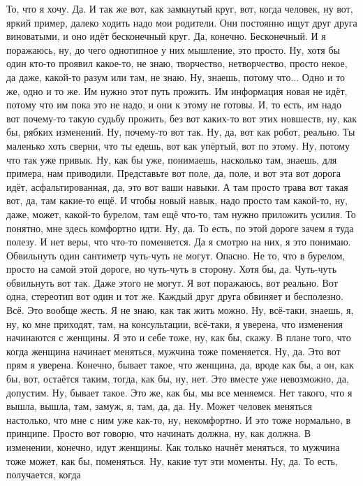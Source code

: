 То, что я хочу. Да.
И так же вот, как замкнутый круг,
вот, когда человек, ну вот,
яркий пример, далеко ходить надо
мои родители. Они
постоянно ищут друг друга виноватыми,
и оно идёт бесконечный круг.
Да, конечно. Бесконечный.
И я поражаюсь, ну, до чего однотипное
у них мышление,
это просто. Ну, хотя бы один кто-то
проявил какое-то, не знаю,
творчество, нетворчество, просто
некое, да даже, какой-то
разум или там, не знаю.
Ну, знаешь, потому что... Одно и то же,
одно и то же. Им нужно
этот путь прожить. Им информация новая
не идёт, потому что им пока
это не надо, и они к этому не готовы.
И, то есть, им надо вот почему-то
такую судьбу прожить, без вот каких-то вот этих
новшеств, ну, как бы, рябких изменений.
Ну, почему-то вот так.
Ну, да, вот как робот, реально.
Ты маленько хоть сверни, что ты
едешь, вот как упёртый, вот по этому.
Ну, потому что так уже привык.
Ну, как бы уже, понимаешь, насколько там,
знаешь, для примера,
нам приводили. Представьте
вот поле, да, поле,
и вот эта вот дорога идёт,
асфальтированная, да, это вот ваши навыки.
А там просто трава вот такая вот, да,
там какие-то ещё. И чтобы
новый навык, надо просто там какой-то, ну,
даже, может, какой-то бурелом,
там ещё что-то, там нужно приложить усилия.
То понятно, мне здесь комфортно идти.
Ну, да. То есть, по этой дороге
зачем я туда полезу.
И нет веры, что что-то поменяется.
Да я смотрю на них, я это понимаю.
Обвильнуть один сантиметр чуть-чуть
не могут. Опасно.
Не то, что в бурелом, просто на самой
этой дороге, но чуть-чуть в сторону.
Хотя бы, да.
Чуть-чуть обвильнуть вот так.
Даже этого не могут.
Я вот поражаюсь, вот реально.
Вот одна, стереотип
вот один и тот же. Каждый
друг друга обвиняет
и бесполезно. Всё. Это вообще
жесть. Я не знаю, как так жить можно.
Ну, всё-таки, знаешь, я,
ну, ко мне приходят, там, на консультации,
всё-таки, я уверена, что
изменения начинаются
с женщины.
Я это и себе тоже, ну, как бы, скажу.
В плане того, что
когда женщина начинает меняться,
мужчина тоже поменяется. Ну, да.
Это вот прям я уверена.
Конечно, бывает такое, что женщина, да, вроде
как бы, а он, как бы, вот, остаётся
таким, тогда, как бы, ну, нет.
Это вместе уже невозможно, да, допустим. Ну, бывает
такое. Это же, как бы, мы все
меняемся. Нет такого, что
я вышла, вышла, там, замуж, я, там,
да, да. Ну. Может человек меняться
настолько, что мне с ним уже как-то, ну, некомфортно.
И это тоже нормально, в принципе.
Просто вот говорю, что
начинать должна, ну, как должна.
В изменении, конечно, идут
женщины. Как только начнёт меняться,
то мужчина тоже может, как бы,
поменяться. Ну, какие тут эти моменты.
Ну, да. То есть, получается, когда
